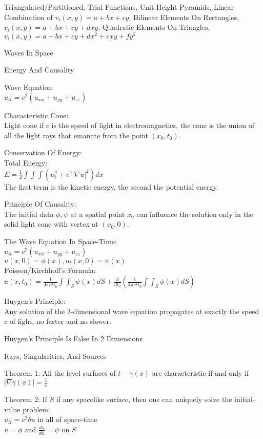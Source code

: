 Triangulated/Partitioned, Trial Functions, Unit Height Pyramids, Linear Combination of $v_i (x,y)=a+bx+cy$, Bilinear Elements On Rectangles, $v_i (x,y)=a+bx+cy+dxy$, Quadratic Elements On Triangles, $v_i (x,y)=a+bx+cy+dx^2+exy+fy^2$

Waves In Space

Energy And Causality

Wave Equation: \\
$u_{tt}=c^2 (u_{xx}+u_{yy}+u_{zz})$

Characteristic Cone: \\
Light cone if $c$ is the speed of light in electromagnetics, the cone is the union of all the light rays that emanate from the point $(x_0,t_0)$.

Conservation Of Energy: \\
Total Energy: \\
$E = \frac{1}{2} \int \int \int (u_t^2 + c^2 |\nabla u|^2) dx$ \\
The first term is the kinetic energy, the second the potential energy.

Principle Of Causality: \\
The initial data $\phi, \psi$ at a spatial point $x_0$ can influence the solution only in the solid light cone with vertex at $(x_0,0)$.

The Wave Equation In Space-Time: \\
$u_{tt}=c^2 (u_{xx}+u_{yy}+u_{zz})$ \\
$u(x,0)=\phi (x), u_t (x,0)=\psi (x)$ \\
Poisson/Kirchhoff's Formula: \\
$u(x,t_0)=\frac{1}{4 \pi c^2 t_0} \int \int_S \psi (x) dS + \frac{d}{dt_0} \left(\frac{1}{4 \pi c^2 t_0} \int \int_S \phi(x) dS \right)$

Huygen's Principle: \\
Any solution of the $3$-dimensional wave equation propagates at exactly the speed $c$ of light, no faster and no slower.

Huygen's Principle Is False In $2$ Dimensions

Rays, Singularities, And Sources

Theorem 1: All the level surfaces of $t-\gamma (x)$ are characteristic if and only if $|\nabla \gamma (x)|=\frac{1}{c}$

Theorem 2: If $S$ if any spacelike surface, then one can uniquely solve the initial-value problem: \\
$u_{tt}=c^2 \delta u$ in all of space-time \\
$u=\phi$ and $\frac{du}{dn}=\psi$ on $S$

